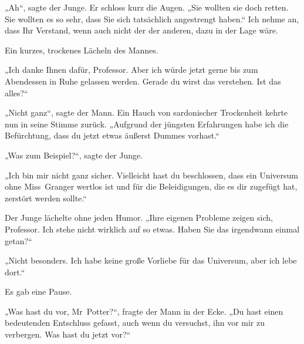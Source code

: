„Ah“, sagte der Junge. Er schloss kurz die Augen.
„Sie wollten sie doch retten. Sie wollten es so sehr, dass Sie sich tatsächlich angestrengt haben.“ Ich nehme an, dass Ihr Verstand, wenn auch nicht der der anderen, dazu in der Lage wäre.

Ein kurzes, trockenes Lächeln des Mannes.

„Ich danke Ihnen dafür, Professor. Aber ich würde jetzt gerne bis zum Abendessen in Ruhe gelassen werden. Gerade du wirst das verstehen. Ist das alles?“

„Nicht ganz“, sagte der Mann. Ein Hauch von sardonischer Trockenheit kehrte nun in seine Stimme zurück.
„Aufgrund der jüngsten Erfahrungen habe ich die Befürchtung, dass du jetzt etwas äußerst Dummes vorhast.“

„Was zum Beispiel?“, sagte der Junge.

„Ich bin mir nicht ganz sicher. Vielleicht hast du beschlossen, dass ein Universum ohne Miss~Granger wertlos ist und für die Beleidigungen, die es dir zugefügt hat, zerstört werden sollte.“

Der Junge lächelte ohne jeden Humor.
„Ihre eigenen Probleme zeigen sich, Professor. Ich stehe nicht wirklich auf so etwas. Haben Sie das irgendwann einmal getan?“

„Nicht besonders. Ich habe keine große Vorliebe für das Universum, aber ich lebe dort.“

Es gab eine Pause.

„Was hast du vor, Mr~Potter?“, fragte der Mann in der Ecke.
„Du hast einen bedeutenden Entschluss gefasst, auch wenn du versuchst, ihn vor mir zu verbergen. Was hast du jetzt vor?“

